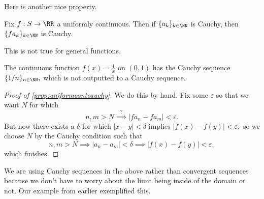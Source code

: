 Here is another nice property.
\begin{proposition} \label{prop:uniformcontcauchy}
	Fix $f:S\to\RR$ a uniformly continuous. Then if $\{a_k\}_{k\in\NN}$ is Cauchy, then $\{fa_k\}_{k\in\NN}$ is Cauchy.
\end{proposition}
This is not true for general functions.
\begin{example}
	The continuous function $f(x)=\frac1x$ on $(0,1)$ has the Cauchy sequence $\{1/n\}_{n\in\NN},$ which is not outputted to a Cauchy sequence.
\end{example}
\begin{proof}[Proof of \autoref{prop:uniformcontcauchy}]
	We do this by hand. Fix some $\varepsilon$ so that we want $N$ for which
	\[n,m>N\stackrel?\implies|fa_n-fa_m|<\varepsilon.\]
	But now there exists a $\delta$ for which $|x-y|<\delta$ implies $|f(x)-f(y)|<\varepsilon,$ so we choose $N$ by the Cauchy condition such that
	\[n,m>N\implies|a_n-a_m|<\delta\implies|f(x)-f(y)|<\varepsilon,\]
	which finishes.
\end{proof}
\begin{remark}
	We are using Cauchy sequences in the above rather than convergent sequences because we don't have to worry about the limit being inside of the domain or not. Our example from earlier exemplified this.
\end{remark}

